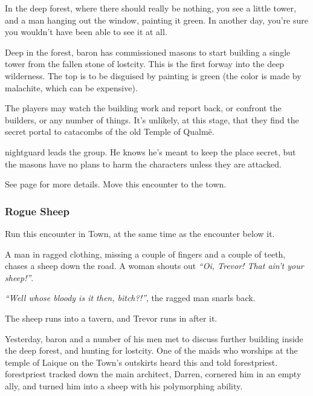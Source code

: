 \begin{boxtext}

	In the deep forest, where there should really be nothing, you see a little tower, and a man hanging out the window, painting it green.  In another day, you're sure you wouldn't have been able to see it at all.

\end{boxtext}

Deep in the forest, \gls{baron} has commissioned masons to start building a single tower from the fallen stone of \gls{lostcity}. This is the first forway into the deep wilderness.  The top is to be disguised by painting is green (the color is made by malachite, which can be expensive).

The players may watch the building work and report back, or confront the builders, or any number of things.  It's unlikely, at this stage, that they find the secret portal to catacombs of the old Temple of Qualm\"{e}.

\gls{nightguard} leads the group.  He knows he's meant to keep the place secret, but the masons have no plans to harm the characters unless they are attacked.

See page \pageref{green_tower} for more details.  Move this encounter to the town.

\subsubsection{Rogue Sheep}

Run this encounter in Town, at the same time as the encounter below it.

\begin{boxtext}
	A man in ragged clothing, missing a couple of fingers and a couple of teeth, chases a sheep down the road.  A woman shouts out \emph{``Oi, Trevor! That ain't your sheep!''}.

	\emph{``Well whose bloody is it then, bitch?!''}, the ragged man snarls back.

	The sheep runs into a tavern, and Trevor runs in after it.
\end{boxtext}

Yesterday, \gls{baron} and a number of his men met to discuss further building inside the deep forest, and hunting for \gls{lostcity}.  One of the maids who worships at the temple of Laique on the Town's outskirts heard this and told \gls{forestpriest}.  \Gls{forestpriest} tracked down the main architect, Darren, cornered him in an empty ally, and turned him into a sheep with his polymorphing ability.

